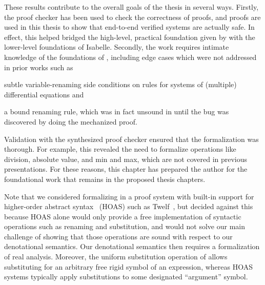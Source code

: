 \documentclass[12pt]{cmuthesis}
\theoremstyle{definition}
\theoremstyle{remark}
\begin{document}
These results contribute to the overall goals of the thesis in several ways.
Firstly, the proof checker has been used to check the correctness of \dL proofs, and \dL proofs are used in this thesis to show that end-to-end verified systems are actually safe.
In effect, this helped bridged the high-level, practical foundation given by \dL with the lower-level foundations of Isabelle.
Secondly, the work requires intimate knowledge of the foundations of \dL, including edge cases which were not addressed in prior works such as
\begin{inparaenum}[i)]
\item subtle variable-renaming side conditions on rules for systems of (multiple) differential equations and
\item a bound renaming rule, which was in fact unsound in \KeYmaeraX until the bug was discovered by doing the mechanized proof.
\end{inparaenum}
Validation with the synthesized proof checker ensured that the formalization was thorough.
For example, this revealed the need to formalize operations like division, absolute value, and min and max, which are not covered in previous presentations.
For these reasons, this chapter has prepared the author for the foundational work that remains in the proposed thesis chapters.

Note that we considered formalizing \dL in a proof system with built-in support for higher-order abstract syntax~\cite{DBLP:conf/pldi/PfenningE88} (HOAS) such as Twelf~\cite{DBLP:conf/cade/PfenningS99}, but decided against this because HOAS alone would only provide a free implementation of syntactic operations such as renaming and substitution, and would not solve our main challenge of showing that those operations are sound with respect to our denotational semantics. Our denotational semantics then requires a formalization of real analysis. Moreover, the uniform substitution operation of \dL allows substituting for an arbitrary free rigid symbol of an expression, whereas HOAS systems typically apply substitutions to some designated ``argument'' symbol.
\end{document}
